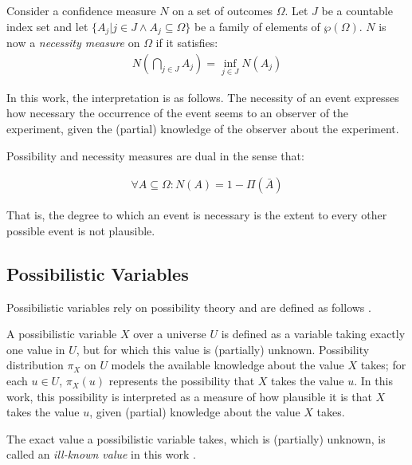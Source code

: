 \begin{definition}
Consider a confidence measure $N$ on a set of outcomes $\Omega$. Let $J$ be a countable index set and let $\{ A_{j} | j \in J \wedge A_{j} \subseteq \Omega \}$ be a family of elements of $\wp(\Omega)$. $N$ is now a \emph{necessity measure} on $\Omega$ if it satisfies:
	\begin{align}
	N\left(\bigcap_{j \in J} A_{j} \right) = \inf_{j \in J} N(A_{j})
	\end{align}
\end{definition}

In this work, the interpretation is as follows. The necessity of an event expresses how necessary the occurrence of the event seems to an observer of the experiment, given the (partial) knowledge of the observer about the experiment.

Possibility and necessity measures are dual in the sense that:

\begin{align}
\forall A \subseteq \Omega : N(A) = 1 - \Pi(\bar{A})
\end{align}

That is, the degree to which an event is necessary is the extent to every other possible event is not plausible.

\subsection{\label{subsec:possibilistic-variables}Possibilistic Variables}
Possibilistic variables rely on possibility theory \cite{Dubois1988a} and are defined as follows \cite{Pons2011}.

\begin{definition}
\label{def;possibilistic-variable}
A possibilistic variable $X$ over a universe $U$ is defined as a variable taking exactly one value in $U$, but for which this value is (partially) unknown. Possibility distribution $\pi_X$ on $U$ models the available knowledge about the value $X$ takes; for each $u\in U$, $\pi_X(u)$ represents the possibility that $X$ takes the value $u$. In this work, this possibility is interpreted as a measure of how plausible it is that $X$ takes the value $u$, given (partial) knowledge about the value $X$ takes.
\end{definition}

The exact value a possibilistic variable takes, which is (partially) unknown, is called an \emph{ill-known value} in this work \cite{Dubois1988a}.


